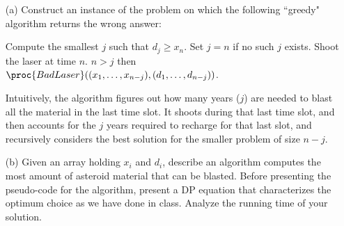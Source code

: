 \documentclass[11pt]{article}
\begin{document}
\begin{enumerate}
\item[(a)] Construct an instance of the problem on which  the following ``greedy" algorithm returns
 the wrong answer:
 \begin{codebox}
\li Compute the smallest $j$ such that $d_j\geq x_n$. Set $j=n$ if no such $j$ exists.
\li Shoot the laser at time $n$.
\li \If $n>j$ then $\proc{BadLaser}( (x_1,\ldots,x_{n-j}),(d_1,\ldots,d_{n-j}))$.
\end{codebox}
Intuitively, the algorithm figures out how many years ($j$) are needed to blast all the material in the last time slot.  It shoots during that last time slot, and then accounts for the $j$ years required to recharge for that last slot, and recursively considers the best solution for the smaller problem of size $n-j$.

\item[(b)]
Given an array holding $x_i$ and $d_i$, describe an algorithm computes the most amount of asteroid material that can be blasted.  Before presenting the pseudo-code for the algorithm, present a DP equation that characterizes the optimum choice as we have done in class. Analyze the running time of your solution.


\end{enumerate}
\hfill
   
\end{document}
